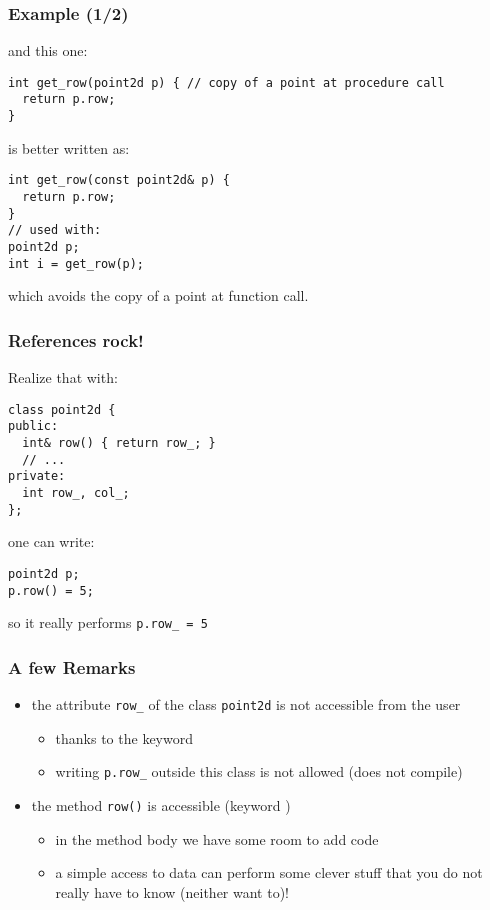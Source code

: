 \documentclass{beamer}
\newcommand{\kw}[1]{{\color{blue}{\texttt{#1}}}\xspace}
\newcommand{\code}[1]{{\scriptsize{\texttt{#1}}}\xspace}
\begin{document}
\begin{frame}[fragile]
  \frametitle{Example (1/2)}

and this one:
\begin{lstlisting}
int get_row(point2d p) { // copy of a point at procedure call
  return p.row;
}
\end{lstlisting}

\smallskip

is better written as:
\begin{lstlisting}
int get_row(const point2d& p) {
  return p.row;
}
// used with:
point2d p;
int i = get_row(p);
\end{lstlisting}
which avoids the copy of a point at function call.

\end{frame}


\begin{frame}[fragile]
  \frametitle{References rock!}

Realize that with:
\begin{lstlisting}
class point2d {
public:
  int& row() { return row_; }
  // ...
private:
  int row_, col_;
};
\end{lstlisting}

one can write:
\begin{lstlisting}
point2d p;
p.row() = 5;
\end{lstlisting}

so it really performs \code{p.row\_ = 5}

\end{frame}


\begin{frame}[fragile]
  \frametitle{A few Remarks}

  \begin{itemize}
  \item the attribute \code{row\_} of the class \code{point2d} is not
    accessible from the user
    \begin{itemize}
    \item thanks to the keyword \kw{private}
    \item writing \code{p.row\_} outside this class is not allowed (does
      not compile)
    \end{itemize}
    \smallskip
  \item the method \code{row()} is accessible (keyword \kw{public})
    \begin{itemize}
    \item in the method body we have some room to add code
    \item a simple access to data can perform some clever stuff that
      you do not really have to know (neither want to)!
    \end{itemize}
  \end{itemize}

\end{frame}
\end{document}
